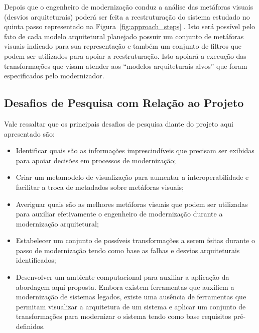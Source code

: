 \documentclass[12pt]{article}
\begin{document}
Depois que o engenheiro de modernização conduz a análise das metáforas visuais (desvios arquiteturais) poderá ser feita a reestruturação do sistema estudado no quinta passo representado na Figura~\ref{fig:approach_steps} . Isto será possível pelo fato de cada modelo arquitetural planejado possuir um conjunto de metáforas visuais indicado para sua representação e também um conjunto de filtros que podem ser utilizados para apoiar a reestruturação. Isto apoiará a execução das transformações que visam atender aos ``modelos arquiteturais alvos'' que foram especificados pelo modernizador. %


\subsection{Desafios de Pesquisa com Relação ao Projeto}

Vale ressaltar que os principais desafios de pesquisa diante do projeto aqui apresentado são:

\begin{itemize}
\item Identificar quais são as informações imprescindíveis que precisam ser exibidas para apoiar decisões em processos de modernização;
\item Criar um metamodelo de visualização para aumentar a interoperabilidade e facilitar a troca de metadados sobre metáforas visuais;
\item Averiguar quais são as melhores metáforas visuais que podem ser utilizadas para auxiliar efetivamente o engenheiro de modernização durante a modernização arquitetural; 
\item Estabelecer um conjunto de possíveis transformações a serem feitas durante o passo de modernização tendo como base as falhas e desvios arquiteturais identificados;
\item Desenvolver um ambiente computacional para auxiliar a aplicação da abordagem aqui proposta. Embora existem ferramentas que auxiliem a modernização de sistemas legados, existe uma ausência de ferramentas que permitam visualizar a arquitetura de um sistema e aplicar um conjunto de transformações para modernizar o sistema tendo como base requisitos pré-definidos.

\end{itemize}
\end{document}
